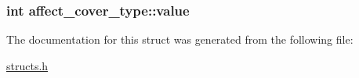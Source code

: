 \hypertarget{structaffect__cover__type_a94ce13ff419fda541dd1735b746d5c88}{
\subsubsection[{value}]{\setlength{\rightskip}{0pt plus 5cm}int affect\-\_\-cover\-\_\-type\-::value}}\label{structaffect__cover__type_a94ce13ff419fda541dd1735b746d5c88}


The documentation for this struct was generated from the following file\-:\begin{DoxyCompactItemize}
\item 
\hyperlink{structs_8h}{structs.\-h}\end{DoxyCompactItemize}
